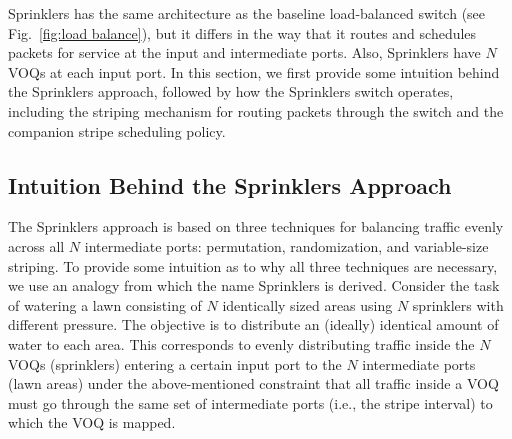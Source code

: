

\begin{comment}
A Sprinklers switch adopts the same 3-stage architecture (shown in Fig.~\ref{fig:load balance}) and 
executes the same periodic sequences of connections in the two switching fabrics,
as a baseline load-balanced switch.   It is different from a baseline load-balanced switch only in the way it routes
and schedules packets for service
at the input and the intermediate ports.  
\end{comment}

\begin{comment}
A Sprinklers switch adopts the same baseline load-balanced switch architecture
(as shown in Fig.~\ref{fig:load balance}) with two fixed switching stages, but
differs in the way that it routes and schedules packets for service at the input
and intermediate ports.
In this section, we first provide some intuition behind the Sprinklers approach.
We then describe how the Sprinklers switch operates,
including the striping mechanism for routing packets through the switch
and the companion stripe scheduling policy.
Then we explain how they enable a Sprinklers switch to eliminate
the packet reordering
problem without paying a hefty price in performance or 
implementation cost.  
\end{comment}

Sprinklers has the same architecture as the baseline load-balanced switch
(see Fig.~\ref{fig:load balance}), but it differs in the way that
it routes and schedules packets for service at the input
and intermediate ports. Also, Sprinklers have $N$ VOQs at each input port.
In this section, we first provide some intuition behind the Sprinklers approach,
followed by how the Sprinklers switch operates,
including the striping mechanism for routing packets through the switch
and the companion stripe scheduling policy.


\subsection{Intuition Behind the Sprinklers Approach}

The Sprinklers approach is based on three techniques for balancing traffic evenly across all $N$ intermediate ports:
permutation, randomization, and variable-size striping.
To provide some intuition as to why all three techniques are necessary, we use
an analogy from which the name Sprinklers is derived.
Consider the task of watering a lawn consisting of $N$ identically sized areas using $N$ sprinklers with different pressure.
The objective is to distribute an (ideally) identical amount of water to each area.  This
corresponds to evenly distributing traffic inside the $N$ VOQs (sprinklers) entering a certain input port to the $N$ intermediate
ports (lawn areas)  
under the above-mentioned constraint that all traffic inside a VOQ must go through the same 
set of intermediate ports (i.e., the stripe interval) to which the VOQ is mapped.



